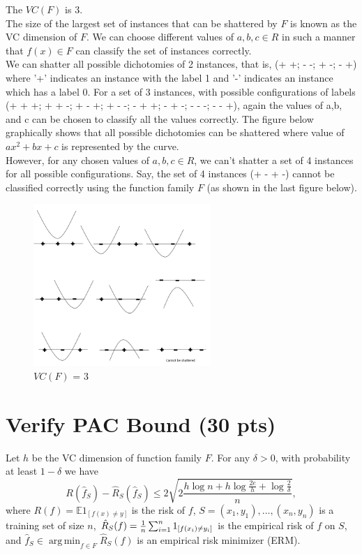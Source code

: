 \documentclass[a4paper]{article}
\theoremstyle{definition}
\DeclareMathOperator*{\argmin}{arg\,min}
\def\E{\mathbb E}
\newenvironment{soln}{
    \leavevmode\color{blue}\ignorespaces
}{}
\begin{document}
\begin{soln}
The $VC(F)$ is 3.
\\The size of the largest set of instances that can be shattered by $F$ is known as the VC dimension of $F$. We can choose different values of $a,b,c \in R$ in such a manner that $f(x) \in F$ can classify the set of instances correctly. 
\\We can shatter all possible dichotomies of 2 instances, that is, (+ +; - -; + -; - +) where  '+' indicates an instance with the label 1 and '-' indicates an instance which has a label 0. For a set of 3 instances, with possible configurations of labels (+ + +; + + -; + - +; + - -; - + +; - + -; - - -; - - +), again the values of a,b, and c can be chosen to classify all the values correctly. The figure below graphically shows that all possible dichotomies can be shattered where value of  $ax^2+bx+c$ is represented by the curve.
\\However, for any chosen values of $a,b,c \in R$, we can't shatter a set of 4 instances for all possible configurations. Say, the set of 4 instances (+ - + -) cannot be classified correctly using the function family $F$ (as shown in the last figure below).  


\begin{figure}[h!]
	        \centering
	        \includegraphics[width=0.6\textwidth]{1Graph.png} 
	        \captionsetup{labelformat=empty}
	        \caption{ $VC(F)$ = 3}
	        \label{ $VC(F)$ = 3}
\end{figure}



\end{soln}

\section{Verify PAC Bound (30 pts)}
Let $h$ be the VC dimension of function family $F$.
For any $\delta>0$, with probability at least $1-\delta$ we have
$$R(\hat f_S) - \hat R_S(\hat f_S) \le 2 \sqrt{2 \frac{h \log n + h \log\frac{2e}{h}  + \log \frac{2}{\delta} }{n}},$$
where $R(f) = \E 1_{[f(x)\neq y]}$ is the risk of $f$,
$S=(x_1,y_1), \ldots, (x_n, y_n)$ is a training set of size $n$,
$\hat R_S(f) = {1\over n} \sum_{i=1}^n 1_{[f(x_i)\neq y_i]}$ is the empirical risk of $f$ on $S$,
and 
$\hat f_S \in \argmin_{f\in F} \hat R_S(f)$ is an empirical risk minimizer (ERM).
\end{document}
